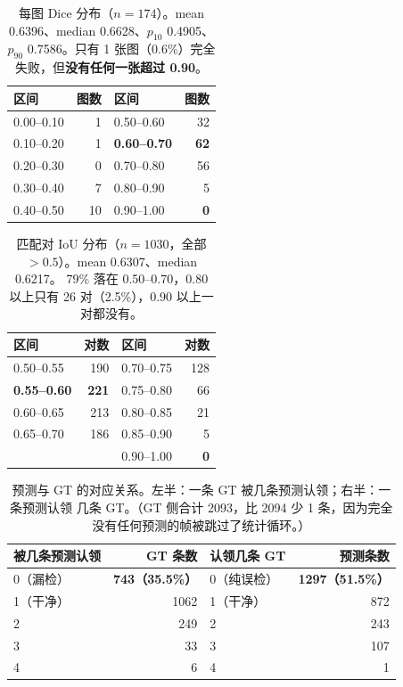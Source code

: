 \documentclass{article}
\begin{document}
\begin{table}[t]
\centering
\caption{每图 Dice 分布（$n=174$）。mean 0.6396、median 0.6628、$p_{10}$ 0.4905、
$p_{90}$ 0.7586。只有 1 张图（0.6\%）完全失败，但\textbf{没有任何一张超过 0.90}。}
\label{tab:dicedist}
\small
\begin{tabular}{lrlr}
\toprule
区间 & 图数 & 区间 & 图数 \\
\midrule
0.00--0.10 & 1  & 0.50--0.60 & 32 \\
0.10--0.20 & 1  & \textbf{0.60--0.70} & \textbf{62} \\
0.20--0.30 & 0  & 0.70--0.80 & 56 \\
0.30--0.40 & 7  & 0.80--0.90 & 5 \\
0.40--0.50 & 10 & 0.90--1.00 & \textbf{0} \\
\bottomrule
\end{tabular}
\end{table}

\begin{table}[t]
\centering
\caption{匹配对 IoU 分布（$n=1030$，全部 $>0.5$）。mean 0.6307、median 0.6217。
79\% 落在 0.50--0.70，0.80 以上只有 26 对（2.5\%），0.90 以上一对都没有。}
\label{tab:ioudist}
\small
\begin{tabular}{lrlr}
\toprule
区间 & 对数 & 区间 & 对数 \\
\midrule
0.50--0.55 & 190 & 0.70--0.75 & 128 \\
\textbf{0.55--0.60} & \textbf{221} & 0.75--0.80 & 66 \\
0.60--0.65 & 213 & 0.80--0.85 & 21 \\
0.65--0.70 & 186 & 0.85--0.90 & 5 \\
        &     & 0.90--1.00 & \textbf{0} \\
\bottomrule
\end{tabular}
\end{table}

\begin{table}[t]
\centering
\caption{预测与 GT 的对应关系。左半：一条 GT 被几条预测认领；右半：一条预测认领
几条 GT。（GT 侧合计 2093，比 2094 少 1 条，因为完全没有任何预测的帧被跳过了统计循环。）}
\label{tab:relations}
\small
\begin{tabular}{lrlr}
\toprule
被几条预测认领 & GT 条数 & 认领几条 GT & 预测条数 \\
\midrule
0（漏检）   & \textbf{743（35.5\%）} & 0（纯误检） & \textbf{1297（51.5\%）} \\
1（干净）   & 1062 & 1（干净） & 872 \\
2           & 249  & 2         & 243 \\
3           & 33   & 3         & 107 \\
4           & 6    & 4         & 1 \\
\bottomrule
\end{tabular}
\end{table}
\end{document}
